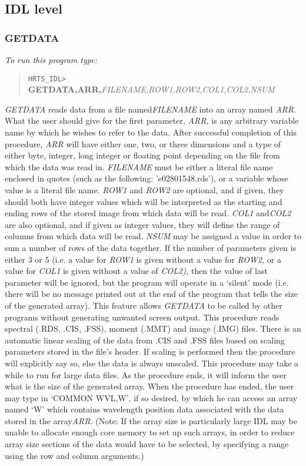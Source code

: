 \subsection{IDL level}

\subsubsection{GETDATA}

{\em To run this program type:}
\begin{quote}
{\tt HRTS\_IDL> }{\bf GETDATA,ARR,}{\it FILENAME,ROW1,ROW2,COL1,COL2,NSUM}
\end{quote}
{\em GETDATA} reads data from a file named{\em FILENAME} into an array named
{\em ARR.}  What the user should give for the first parameter, {\em ARR,} is any
 arbitrary variable name by which he wishes to refer to the data.  After
 successful completion of this procedure, {\em ARR} will have either one, two,
 or three dimensions and a type of either byte, integer, long integer or
 floating point depending on the file from which the data was read in.
{\em FILENAME} must be either a literal file name enclosed in quotes (such as
 the following: 'e02801548.rds'), or a variable
 whose value is a literal file name. {\em ROW1} and {\em ROW2} are optional, and
if
 given, they should both have integer values which will be
 interpreted as the starting and ending rows of the stored image from
 which data will be read. {\em COL1} and{\em COL2} are also optional, and if
given
 as integer values, they will define the range of columns from
 which data will be read. {\em NSUM} may be assigned a value in order to sum
 a number of rows of the data together.  If the number of parameters
 given is either 3 or 5 (i.e. a value for {\em ROW1} is given without a value
 for {\em ROW2,} or a value for {\em COL1} is given without a value of {\em
 COL2),} then
 the value of last parameter will be ignored, but the program will
 operate in a `silent' mode (i.e. there will be no message printed out
 at the end of the program that tells the size of the generated array).
 This feature allows {\em GETDATA} to be called by other programs without
 generating unwanted screen output.
 This procedure reads spectral (.RDS, .CIS, .FSS), moment (.MMT) and
 image (.IMG) files.  There is an automatic linear scaling of the data
 from .CIS and .FSS files based on scaling parameters stored in the
 file's header.  If scaling is performed then the procedure will
 explicitly say so, else the data is always unscaled.
 This procedure may take a while to run for large data files.  As the
 procedure ends, it will inform the user what is the size of the
 generated array.  When the procedure has ended, the user may type in
`COMMON WVL,W', if so desired, by which he can access an array named
`W' which contains wavelength position data associated with the data
 stored in the array{\em ARR.} (Note: If the array size is particularly large
 IDL may be unable to allocate enough core memory to set up such arrays, in
 order to reduce array size sections of the data would have to be selected, by
 specifying a range using the row and column arguments.)

